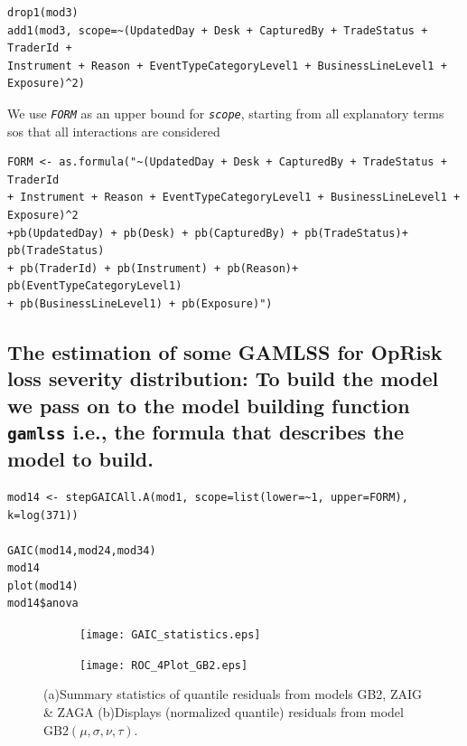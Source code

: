 \documentclass{DissertateUSU}
\begin{document}
\small

\begin{verbatim}
drop1(mod3)
add1(mod3, scope=~(UpdatedDay + Desk + CapturedBy + TradeStatus + TraderId +
Instrument + Reason + EventTypeCategoryLevel1 + BusinessLineLevel1 + Exposure)^2)
\end{verbatim}

\normalsize

We use \emph{\texttt{FORM}} as an upper bound for \emph{\texttt{scope}},
starting from all explanatory terms sos that all interactions are
considered

\small

\begin{verbatim}
FORM <- as.formula("~(UpdatedDay + Desk + CapturedBy + TradeStatus + TraderId
+ Instrument + Reason + EventTypeCategoryLevel1 + BusinessLineLevel1 + Exposure)^2
+pb(UpdatedDay) + pb(Desk) + pb(CapturedBy) + pb(TradeStatus)+ pb(TradeStatus)
+ pb(TraderId) + pb(Instrument) + pb(Reason)+ pb(EventTypeCategoryLevel1) 
+ pb(BusinessLineLevel1) + pb(Exposure)")
\end{verbatim}

\normalsize

\subsection{The estimation of some GAMLSS for OpRisk loss severity distribution: To build the model we pass on to the model building function \texttt{gamlss} i.e., the formula that describes the model to build.}
\label{sec:The estimation of some GAMLSS for OpRisk loss severity distribution}

\small

\begin{verbatim}
mod14 <- stepGAICAll.A(mod1, scope=list(lower=~1, upper=FORM), k=log(371))

GAIC(mod14,mod24,mod34)
mod14
plot(mod14)
mod14$anova
\end{verbatim}

\normalsize

\begin{figure}
\centering
\begin{subfigure}[b]{0.5\textwidth}
   \texttt{[image: GAIC\_statistics.eps]}
   \caption{}
   \label{Residuals summary statistics} 
\end{subfigure}

\begin{subfigure}[b]{0.5\textwidth}
   \texttt{[image: ROC\_4Plot\_GB2.eps]}
   \caption{}
   \label{Residuals_GB2}
\end{subfigure}

\caption[Normalized quantile residuals from model GB2]{(a)Summary statistics of quantile residuals from models GB2, ZAIG \& ZAGA (b)Displays (normalized quantile) residuals from model $\mbox{GB}2(\mu,\sigma,\nu,\tau)$.}
\end{figure}
\end{document}
